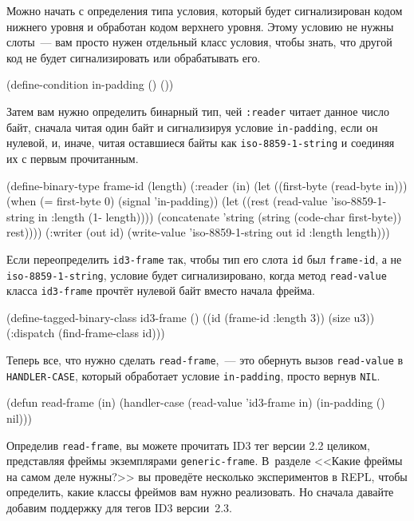 Можно начать с определения типа условия, который будет сигнализирован кодом нижнего уровня
и обработан кодом верхнего уровня. Этому условию не нужны слоты~--- вам просто нужен
отдельный класс условия, чтобы знать, что другой код не будет сигнализировать или
обрабатывать его.

\begin{myverb}
(define-condition in-padding () ())
\end{myverb}

Затем вам нужно определить бинарный тип, чей \lstinline{:reader} читает данное число байт,
сначала читая один байт и сигнализируя условие \lstinline{in-padding}, если он нулевой, и,
иначе, читая оставшиеся байты как \lstinline{iso-8859-1-string} и соединяя их с первым
прочитанным.

\begin{myverb}
(define-binary-type frame-id (length)
  (:reader (in)
    (let ((first-byte (read-byte in)))
      (when (= first-byte 0) (signal 'in-padding))
      (let ((rest (read-value 'iso-8859-1-string in :length (1- length))))
        (concatenate
         'string (string (code-char first-byte)) rest))))
  (:writer (out id)
    (write-value 'iso-8859-1-string out id :length length)))
\end{myverb}

Если переопределить \lstinline{id3-frame} так, чтобы тип его слота \lstinline{id} был
\lstinline{frame-id}, а не \lstinline{iso-8859-1-string}, условие будет сигнализировано, когда метод
\lstinline{read-value} класса \lstinline{id3-frame} прочтёт нулевой байт вместо начала фрейма.

\begin{myverb}
(define-tagged-binary-class id3-frame ()
  ((id (frame-id :length 3))
   (size u3))
  (:dispatch (find-frame-class id)))
\end{myverb}

Теперь все, что нужно сделать \lstinline{read-frame},~--- это обернуть вызов \lstinline{read-value} в
\lstinline{HANDLER-CASE}, который обработает условие \lstinline{in-padding}, просто вернув
\lstinline{NIL}.

\begin{myverb}
(defun read-frame (in)
  (handler-case (read-value 'id3-frame in)
    (in-padding () nil)))
\end{myverb}

Определив \lstinline{read-frame}, вы можете прочитать ID3 тег версии 2.2 целиком, представляя
фреймы экземплярами \lstinline{generic-frame}. В~разделе <<Какие фреймы на самом деле нужны?>>
вы проведёте несколько экспериментов в REPL, чтобы определить, какие классы фреймов вам
нужно реализовать. Но сначала давайте добавим поддержку для тегов ID3 версии~2.3.

